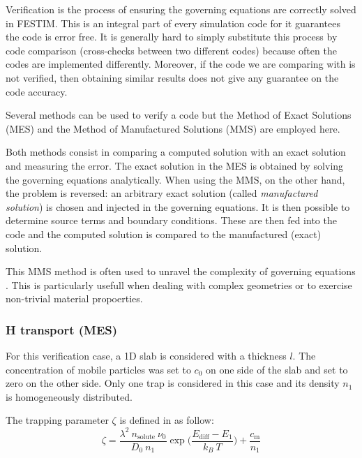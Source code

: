 Verification is the process of ensuring the governing equations are correctly solved in FESTIM.
This is an integral part of every simulation code for it guarantees the code is error free.
It is generally hard to simply substitute this process by code comparison (cross-checks between two different codes) because often the codes are implemented differently.
Moreover, if the code we are comparing with is not verified, then obtaining similar results does not give any guarantee on the code accuracy.

Several methods can be used to verify a code but the Method of Exact Solutions (MES) and the Method of Manufactured Solutions (MMS) are employed here.

Both methods consist in comparing a computed solution with an exact solution and measuring the error.
The exact solution in the MES is obtained by solving the governing equations analytically.
When using the MMS, on the other hand, the problem is reversed: an arbitrary exact solution (called \textit{manufactured solution}) is chosen and injected in the governing equations.
It is then possible to determine source terms and boundary conditions.
These are then fed into the code and the computed solution is compared to the manufactured (exact) solution.

This MMS method is often used to unravel the complexity of governing equations .
This is particularly usefull when dealing with complex geometries or to exercise non-trivial material propoerties.

\subsubsection{H transport (MES)} \label{analytical}


For this verification case, a 1D slab is considered with a thickness $l$.
The concentration of mobile particles was set to $c_0$ on one side of the slab and set to zero on the other side.
Only one trap is considered in this case and its density $n_1$ is homogeneously distributed.

The trapping parameter $\zeta$ is defined in  as follow:
\begin{equation}
    \zeta = \frac{\lambda^2 \: n_\mathrm{solute} \: \nu_0}{D_0 \: n_1}\exp\bigg(\frac{E_\mathrm{diff} - E_1}{k_B \: T}\bigg) + \frac{c_\mathrm{m}}{n_1}
\end{equation}

